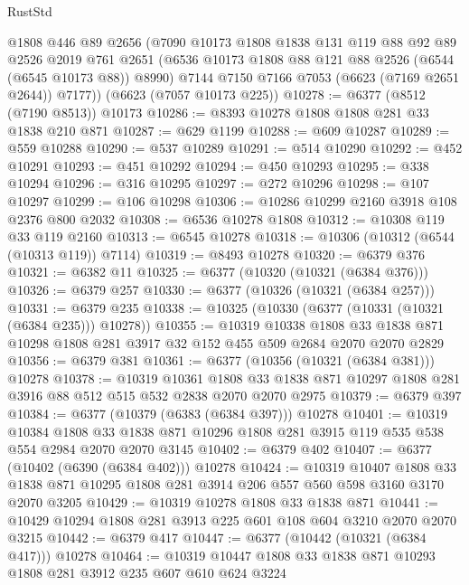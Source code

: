\begin{lexlean}{RustStd}
\begin{coremodule}
      @1808
      @446
      @89
      @2656
      (@7090
        @10173
        @1808
        @1838
        @131
        @119
        @88
        @92
        @89
        @2526
        @2019
        @761
        @2651
        (@6536 @10173 @1808 @88 @121 @88 @2526 (@6544 (@6545 @10173 @88)) @8990)
        @7144
        @7150
        @7166
        @7053
        (@6623 (@7169 @2651 @2644))
        @7177))
    (@6623 (@7057 @10173 @225))
@10278 := @6377 (@8512 (@7190 @8513)) @10173
@10286 := @8393 @10278 @1808 @1808 @281 @33 @1838 @210 @871
@10287 := @629 @1199
@10288 := @609 @10287
@10289 := @559 @10288
@10290 := @537 @10289
@10291 := @514 @10290
@10292 := @452 @10291
@10293 := @451 @10292
@10294 := @450 @10293
@10295 := @338 @10294
@10296 := @316 @10295
@10297 := @272 @10296
@10298 := @107 @10297
@10299 := @106 @10298
@10306 := @10286 @10299 @2160 @3918 @108 @2376 @800 @2032
@10308 := @6536 @10278 @1808
@10312 := @10308 @119 @33 @119 @2160
@10313 := @6545 @10278
@10318 := @10306 (@10312 (@6544 (@10313 @119)) @7114)
@10319 := @8493 @10278
@10320 := @6379 @376
@10321 := @6382 @11
@10325 := @6377 (@10320 (@10321 (@6384 @376)))
@10326 := @6379 @257
@10330 := @6377 (@10326 (@10321 (@6384 @257)))
@10331 := @6379 @235
@10338 := @10325 (@10330 (@6377 (@10331 (@10321 (@6384 @235))) @10278))
@10355 := @10319
    @10338
    @1808
    @33
    @1838
    @871
    @10298
    @1808
    @281
    @3917
    @32
    @152
    @455
    @509
    @2684
    @2070
    @2070
    @2829
@10356 := @6379 @381
@10361 := @6377 (@10356 (@10321 (@6384 @381))) @10278
@10378 := @10319
    @10361
    @1808
    @33
    @1838
    @871
    @10297
    @1808
    @281
    @3916
    @88
    @512
    @515
    @532
    @2838
    @2070
    @2070
    @2975
@10379 := @6379 @397
@10384 := @6377 (@10379 (@6383 (@6384 @397))) @10278
@10401 := @10319
    @10384
    @1808
    @33
    @1838
    @871
    @10296
    @1808
    @281
    @3915
    @119
    @535
    @538
    @554
    @2984
    @2070
    @2070
    @3145
@10402 := @6379 @402
@10407 := @6377 (@10402 (@6390 (@6384 @402))) @10278
@10424 := @10319
    @10407
    @1808
    @33
    @1838
    @871
    @10295
    @1808
    @281
    @3914
    @206
    @557
    @560
    @598
    @3160
    @3170
    @2070
    @3205
@10429 := @10319 @10278 @1808 @33 @1838 @871
@10441 := @10429 @10294 @1808 @281 @3913 @225 @601 @108 @604 @3210 @2070 @2070 @3215
@10442 := @6379 @417
@10447 := @6377 (@10442 (@10321 (@6384 @417))) @10278
@10464 := @10319
    @10447
    @1808
    @33
    @1838
    @871
    @10293
    @1808
    @281
    @3912
    @235
    @607
    @610
    @624
    @3224

\end{coremodule}
\end{lexlean}
